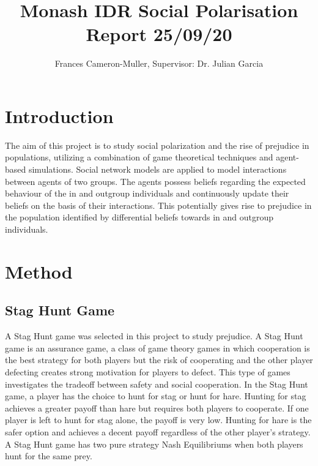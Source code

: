 \documentclass[]{llncs}
\begin{document}
%
\title{Monash IDR Social Polarisation Report 25/09/20}

\author{Frances Cameron-Muller, Supervisor: Dr. Julian Garcia}

\maketitle              %



 \section{Introduction}
  The aim of this project is to study social polarization and the rise of prejudice in populations, utilizing a combination of game theoretical techniques and agent-based simulations. Social network models are applied to model interactions between agents of two groups. The agents possess beliefs regarding the expected behaviour of the in and outgroup individuals and continuously update their beliefs on the basis of their interactions. This potentially gives rise to prejudice in the population identified by differential beliefs towards in and outgroup individuals. 

 \section{Method}
 
 \subsection{Stag Hunt Game}
 A Stag Hunt game was selected in this project to study prejudice. A Stag Hunt game is an assurance game, a class of game theory games in which cooperation is the best strategy for both players but the risk of cooperating and the other player defecting creates strong motivation for players to defect. This type of games investigates the tradeoff between safety and social cooperation. In the Stag Hunt game, a player has the choice to hunt for stag or hunt for hare. Hunting for stag achieves a greater payoff than hare but requires both players to cooperate. If one player is left to hunt for stag alone, the payoff is very low. Hunting for hare is the safer option and achieves a decent payoff regardless of the other player’s strategy. A Stag Hunt game has two pure strategy Nash Equilibriums when both players hunt for the same prey. 
 
\end{document}
